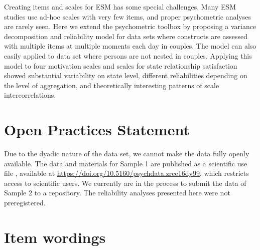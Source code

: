\documentclass[jou,a4paper,draftfirst]{apa6}\usepackage[]{graphicx}\usepackage[]{color}
\begin{document}
Creating items and scales for ESM has some special challenges. Many ESM studies use ad-hoc scales with very few items, and proper psychometric analyses are rarely seen. Here we extend the psychometric toolbox by proposing a variance decomposition and reliability model for data sets where constructs are assessed with multiple items at multiple moments each day in couples. The model can also easily applied to data set where persons are not nested in couples. Applying this model to four motivation scales and scales for state relationship satisfaction showed substantial variability on state level, different reliabilities depending on the level of aggregation, and theoretically interesting patterns of scale intercorrelations.


\section{Open Practices Statement}
Due to the dyadic nature of the data set, we cannot make the data fully openly available. The data and materials for Sample 1 are published as a scientific use file \parencite{zygar_MotiveDispositionsStates_2018a}, available at \url{https://doi.org/10.5160/psychdata.zrce16dy99}, which restricts access to scientific users.
We currently are in the process to submit the data of Sample 2 to a repository. The reliability analyses presented here were not preregistered.

\printbibliography


\appendix
\section{Item wordings}
\end{document}
